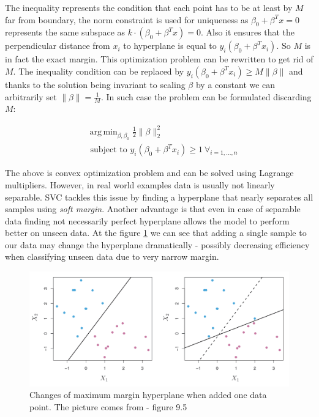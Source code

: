 \documentclass[shortabstract, english, mgr]{iithesis}
\DeclareMathOperator*{\argmin}{arg\,min}
\begin{document}
The inequality represents the condition that each point has to be at least by $M$ far from boundary, the norm constraint is used for uniqueness as $\beta_0 +\beta^Tx = 0$ represents the same subspace as $k\cdot(\beta_0 +\beta^Tx) = 0$. Also it ensures that the perpendicular distance from $x_i$ to hyperplane is equal to $y_i\left(\beta_0 + \beta^Tx_i\right)$. So $M$ is in fact the exact margin. This optimization problem can be rewritten to get rid of $M$. The inequality condition can be replaced by $y_{i}\left(\beta_{0}+\beta^T x_i\right) \geq M\|\beta\|$ and thanks to the solution being invariant to scaling $\beta$ by a constant we can arbitrarily set $\|\beta\| = \frac{1}{M}$. In such case the problem can be formulated discarding $M$:

\begin{align*}
& \argmin_{\beta, \beta_0} \frac{1}{2}\|\beta\|^2_2 \\ &{\text { subject to }} {y_{i}\left(\beta_{0}+\beta^T x_i\right) \geq 1 \ \forall_{i=1, \ldots, n}}
\end{align*}

The above is convex optimization problem and can be solved using Lagrange multipliers. However, in real world examples data is usually not linearly separable. SVC tackles this issue by finding a hyperplane that nearly separates all samples using \textit{soft margin}. Another advantage is that even in case of separable data finding not necessarily perfect hyperplane allows the model to perform better on unseen data. At the figure \ref{fig:svc-robust} we can see that adding a single sample to our data may change the hyperplane dramatically - possibly decreasing efficiency when classifying unseen data due to very narrow margin. 

\begin{figure}
\centering
\includegraphics[width=\textwidth]{images/svc-robust.png}
\caption{Changes of maximum margin hyperplane when added one data point. The picture comes from \cite{ISL} - figure 9.5}
\label{fig:svc-robust}
\end{figure}
\end{document}
